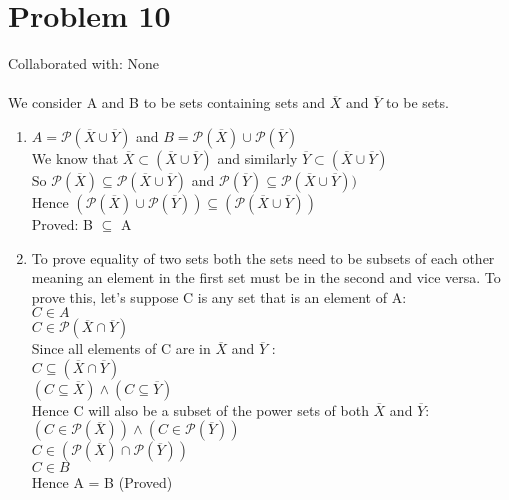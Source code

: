\documentclass{article}
\begin{document}
\section{Problem 10}
Collaborated with: None \\ \\
We consider A and B to be sets containing sets and $\overline{X}$ and $\overline{Y}$ to be sets. \\
\begin{enumerate}
\item %
$A = \mathcal{P}(\overline{X}\cup \overline{Y})$ and $B = \mathcal{P}(\overline{X})\cup \mathcal{P}(\overline{Y})$ \\
We know that $\overline{X} \subset (\overline{X} \cup \overline{Y})$ and similarly $\overline{Y} \subset (\overline{X} \cup \overline{Y}) $ \\
So $ \mathcal{P}(\overline{X}) \subseteq \mathcal{P}(\overline{X} \cup \overline{Y})$ and $\mathcal{P}(\overline{Y}) \subseteq \mathcal{P}(\overline{X} \cup \overline{Y}))$ \\
Hence $(\mathcal{P}(\overline{X})\cup \mathcal{P}(\overline{Y})) \subseteq (\mathcal{P}(\overline{X}\cup \overline{Y}))$ \\
Proved: B $\subseteq$ A
\item %
To prove equality of two sets both the sets need to be subsets of each other meaning an element in the first set must be in the second and vice versa. To prove this, let's suppose C is any set that is an element of A: \\
$ C \in A  $\\
$  C \in \mathcal{P}(\overline{X} \cap \overline{Y})   $\\
Since all elements of C are in $\overline{X}$ and $\overline{Y}$ :\\
$ C \subseteq (\overline{X} \cap \overline{Y})    $\\
$ (C \subseteq \overline{X}) \wedge (C \subseteq \overline{Y})    $\\
Hence C will also be a subset of the power sets of both $\overline{X}$ and $\overline{Y}$: \\
$    (C \in \mathcal{P}(\overline{X})) \wedge  (C \in \mathcal{P}(\overline{Y})) $\\
$   C \in (\mathcal{P}(\overline{X}) \cap \mathcal{P}(\overline{Y}))  $\\
$  C \in B   $ \\
Hence A = B (Proved)\\ 



\end{enumerate}
\end{document}
